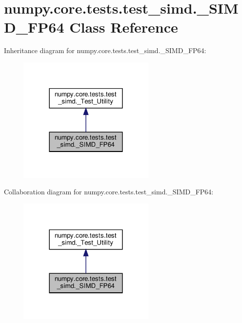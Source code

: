 \hypertarget{classnumpy_1_1core_1_1tests_1_1test__simd_1_1__SIMD__FP64}{}\section{numpy.\+core.\+tests.\+test\+\_\+simd.\+\_\+\+S\+I\+M\+D\+\_\+\+F\+P64 Class Reference}
\label{classnumpy_1_1core_1_1tests_1_1test__simd_1_1__SIMD__FP64}


Inheritance diagram for numpy.\+core.\+tests.\+test\+\_\+simd.\+\_\+\+S\+I\+M\+D\+\_\+\+F\+P64\+:
\nopagebreak
\begin{figure}[H]
\begin{center}
\leavevmode
\includegraphics[width=192pt]{classnumpy_1_1core_1_1tests_1_1test__simd_1_1__SIMD__FP64__inherit__graph}
\end{center}
\end{figure}


Collaboration diagram for numpy.\+core.\+tests.\+test\+\_\+simd.\+\_\+\+S\+I\+M\+D\+\_\+\+F\+P64\+:
\nopagebreak
\begin{figure}[H]
\begin{center}
\leavevmode
\includegraphics[width=192pt]{classnumpy_1_1core_1_1tests_1_1test__simd_1_1__SIMD__FP64__coll__graph}
\end{center}
\end{figure}
